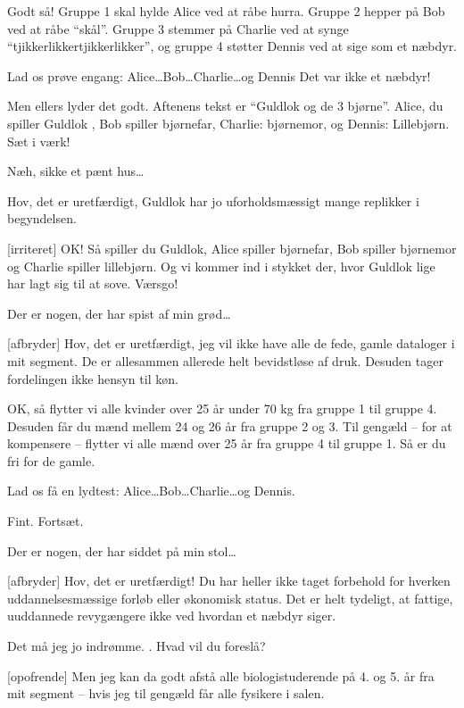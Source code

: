 \documentclass[a4paper,11pt]{article}
\begin{document}
\begin{sketch}
Godt så! Gruppe 1 skal hylde Alice ved at råbe hurra. Gruppe 2 hepper
på Bob ved at råbe ``skål''. Gruppe 3 stemmer på Charlie ved at synge
``tjikkerlikkertjikkerlikker'', og gruppe 4 støtter Dennis ved at sige
som et næbdyr.

Lad os prøve engang: Alice\ldots Bob\ldots Charlie\ldots og Dennis
 Det var ikke et næbdyr!

Men ellers lyder det godt. Aftenens tekst er ``Guldlok og de 3
bjørne''. Alice, du spiller Guldlok , Bob spiller
bjørnefar, Charlie: bjørnemor, og Dennis: Lillebjørn. Sæt i værk!

  Næh, sikke et pænt hus\ldots

  Hov, det er uretfærdigt, Guldlok har jo
uforholdsmæssigt mange replikker i begyndelsen.

[irriteret] OK! Så spiller du Guldlok, Alice spiller
bjørnefar, Bob spiller bjørnemor og Charlie spiller lillebjørn. Og vi
kommer ind i stykket der, hvor Guldlok lige har lagt sig til at sove.
Værsgo!

  Der er nogen, der har spist af min
grød\ldots

[afbryder] Hov, det er uretfærdigt, jeg vil ikke have alle de
fede, gamle dataloger i mit segment. De er allesammen allerede helt
bevidstløse af druk. Desuden tager fordelingen ikke hensyn til køn.

 OK, så flytter vi alle kvinder over 25 år under 70 kg fra
gruppe 1 til gruppe 4. Desuden får du mænd mellem 24 og 26 år fra
gruppe 2 og 3. Til gengæld -- for at kompensere -- flytter vi alle
mænd over 25 år fra gruppe 4 til gruppe 1. Så er du fri for de gamle.

Lad os få en lydtest: Alice\ldots Bob\ldots Charlie\ldots og Dennis.

Fint. Fortsæt.

  Der er nogen, der har siddet på min
stol\ldots

[afbryder] Hov, det er uretfærdigt! Du har heller ikke taget
forbehold for hverken uddannelsesmæssige forløb eller økonomisk
status. Det er helt tydeligt, at fattige, uuddannede revygængere ikke
ved hvordan et næbdyr siger.

 Det må jeg jo indrømme. . Hvad vil du
foreslå?

[opofrende] Men jeg kan da godt afstå alle biologistuderende
på 4. og 5. år fra mit segment -- hvis jeg til gengæld får alle
fysikere i salen.


\end{sketch}
\end{document}
